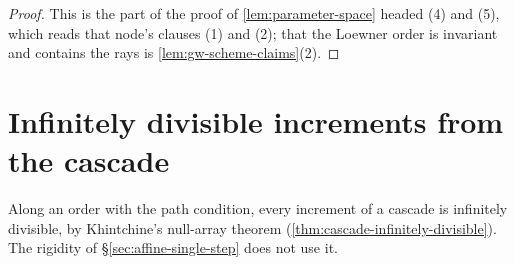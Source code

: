 \begin{proof}
\leanok
This is the part of the proof of \ref{lem:parameter-space} headed (4) and (5), which reads that
node's clauses (1) and (2); that the Loewner order is invariant and contains the rays is
\ref{lem:gw-scheme-claims}(2).
\end{proof}

\section{Infinitely divisible increments from the cascade}
\label{sec:null-array}

Along an order with the path condition, every increment of a cascade is infinitely divisible, by
Khintchine's null-array theorem (\ref{thm:cascade-infinitely-divisible}). The rigidity of
\S\ref{sec:affine-single-step} does not use it.

